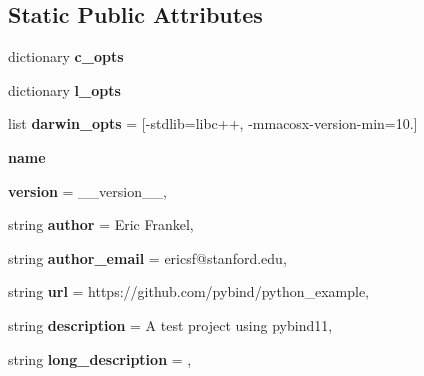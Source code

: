 \subsection*{Static Public Attributes}
\begin{DoxyCompactItemize}
\item 
dictionary {\bfseries c\+\_\+opts}
\item 
dictionary {\bfseries l\+\_\+opts}
\item 
\mbox{\label{classsetup_1_1BuildExt_a942cd42b133cc37a10e4688155676962}} 
list {\bfseries darwin\+\_\+opts} = \mbox{[}\textquotesingle{}-\/stdlib=libc++\textquotesingle{}, \textquotesingle{}-\/mmacosx-\/version-\/min=10.\textquotesingle{}\mbox{]}
\item 
\mbox{\label{classsetup_1_1BuildExt_a63cde2a550ddf707e22d4f93dc271590}} 
{\bfseries name}
\item 
\mbox{\label{classsetup_1_1BuildExt_ae0126fa9abc1ef98f9f444fa137a9cd3}} 
{\bfseries version} = \+\_\+\+\_\+version\+\_\+\+\_\+,
\item 
\mbox{\label{classsetup_1_1BuildExt_acb7fffd8091c0945d3952cabf7f488c5}} 
string {\bfseries author} = \textquotesingle{}Eric Frankel\textquotesingle{},
\item 
\mbox{\label{classsetup_1_1BuildExt_a364654c19ddf5c6a26a11e7799121565}} 
string {\bfseries author\+\_\+email} = \textquotesingle{}ericsf@stanford.\+edu\textquotesingle{},
\item 
\mbox{\label{classsetup_1_1BuildExt_a968e2d21a5cf459eb0091efa406b8e2c}} 
string {\bfseries url} = \textquotesingle{}https\+://github.\+com/pybind/python\+\_\+example\textquotesingle{},
\item 
\mbox{\label{classsetup_1_1BuildExt_a4ddc07d45d333fc55922d5f840e1c102}} 
string {\bfseries description} = \textquotesingle{}A test project using pybind11\textquotesingle{},
\item 
\mbox{\label{classsetup_1_1BuildExt_a92bd98830f1ca88bc0806bf2883f5ab1}} 
string {\bfseries long\+\_\+description} = \textquotesingle{}\textquotesingle{},

\end{DoxyCompactItemize}
